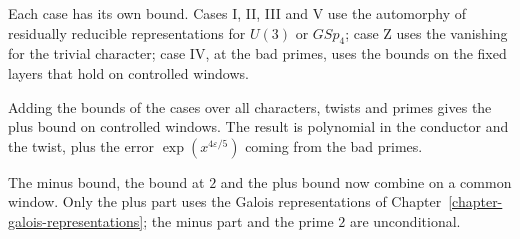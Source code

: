 Each case has its own bound. Cases I, II, III and V use the automorphy of residually reducible representations for $U(3)$ or $GSp_4$; case Z uses the vanishing for the trivial character; case IV, at the bad primes, uses the bounds on the fixed layers that hold on controlled windows.

Adding the bounds of the cases over all characters, twists and primes gives the plus bound on controlled windows. The result is polynomial in the conductor and the twist, plus the error $\exp(x^{4\varepsilon/5})$ coming from the bad primes.

The minus bound, the bound at $2$ and the plus bound now combine on a common window. Only the plus part uses the Galois representations of Chapter~\ref{chapter-galois-representations}; the minus part and the prime $2$ are unconditional.
